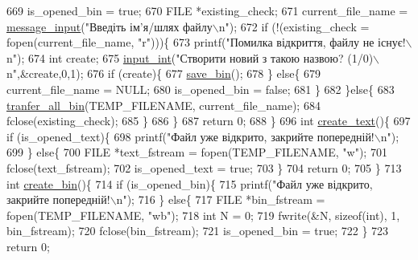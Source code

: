 \begin{DoxyCodeInclude}
{{{{{669         is\_opened\_bin = \textcolor{keyword}{true};
670         FILE *existing\_check;
671         current\_file\_name = \hyperlink{lab__functions_8h_a53c0a255092a68903d4627229c37d7d0}{message\_input}(\textcolor{stringliteral}{"Введіть ім'я/шлях файлу\(\backslash\)n"});
672         \textcolor{keywordflow}{if} (!(existing\_check = fopen(current\_file\_name, \textcolor{stringliteral}{"r"})))\{
673             printf(\textcolor{stringliteral}{"Помилка відкриття, файлу не існує!\(\backslash\)n"});
674             \textcolor{keywordtype}{int} create;
675             \hyperlink{lab__functions_8h_a6f453bc035d85e967bd5032eca31a155}{input\_int}(\textcolor{stringliteral}{"Створити новий з такою назвою? (1/0)\(\backslash\)n"},&create,0,1);
676             \textcolor{keywordflow}{if} (create)\{
677                 \hyperlink{main_8c_ade34d6c87a837a130af82aa7b13db885}{save\_bin}();
678             \} \textcolor{keywordflow}{else}\{
679                 current\_file\_name = NULL;
680                 is\_opened\_bin = \textcolor{keyword}{false};
681             \}
682         \}\textcolor{keywordflow}{else}\{
683             \hyperlink{main_8c_a0225750ccc073d7680cae540419b124a}{tranfer\_all\_bin}(TEMP\_FILENAME, current\_file\_name);
684             fclose(existing\_check);
685         \}
686     \}
687     \textcolor{keywordflow}{return} 0;
688 \}
696 \textcolor{keywordtype}{int} \hyperlink{main_8c_a5b7250e7b7fba439d74ee3ad2b50006f}{create\_text}()\{
697     \textcolor{keywordflow}{if} (is\_opened\_text)\{
698         printf(\textcolor{stringliteral}{"Файл уже відкрито, закрийте попередній!\(\backslash\)n"});
699     \} \textcolor{keywordflow}{else}\{
700         FILE *text\_fstream = fopen(TEMP\_FILENAME, \textcolor{stringliteral}{"w"});
701         fclose(text\_fstream);
702         is\_opened\_text = \textcolor{keyword}{true};
703     \}
704     \textcolor{keywordflow}{return} 0;
705 \}
713 \textcolor{keywordtype}{int} \hyperlink{main_8c_a57ee874fe25c7cad429eb70840ddbeb5}{create\_bin}()\{
714     \textcolor{keywordflow}{if} (is\_opened\_bin)\{
715         printf(\textcolor{stringliteral}{"Файл уже відкрито, закрийте попередній!\(\backslash\)n"});
716     \} \textcolor{keywordflow}{else}\{
717         FILE *bin\_fstream = fopen(TEMP\_FILENAME, \textcolor{stringliteral}{"wb"});
718         \textcolor{keywordtype}{int} N = 0;
719         fwrite(&N, \textcolor{keyword}{sizeof}(\textcolor{keywordtype}{int}), 1, bin\_fstream);
720         fclose(bin\_fstream);
721         is\_opened\_bin = \textcolor{keyword}{true};
722     \}
723     \textcolor{keywordflow}{return} 0;
}}}}}
\end{DoxyCodeInclude}
